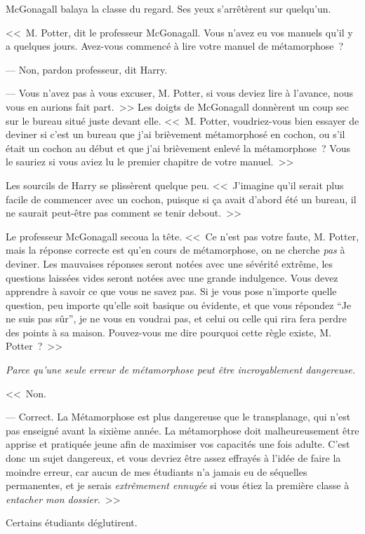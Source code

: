 McGonagall balaya la classe du regard. Ses yeux s'arrêtèrent sur quelqu'un.

<<~M. Potter, dit le professeur McGonagall. Vous n'avez eu vos manuels qu'il y a quelques jours. Avez-vous commencé à lire votre manuel de métamorphose~?

--- Non, pardon professeur, dit Harry.

--- Vous n'avez pas à vous excuser, M. Potter, si vous deviez lire à l'avance, nous vous en aurions fait part.~>> Les doigts de McGonagall donnèrent un coup sec sur le bureau situé juste devant elle. <<~M. Potter, voudriez-vous bien essayer de deviner si c'est un bureau que j'ai brièvement métamorphosé en cochon, ou s'il était un cochon au début et que j'ai brièvement enlevé la métamorphose~? Vous le sauriez si vous aviez lu le premier chapitre de votre manuel.~>>

Les sourcils de Harry se plissèrent quelque peu. <<~J'imagine qu'il serait plus facile de commencer avec un cochon, puisque si ça avait d'abord été un bureau, il ne saurait peut-être pas comment se tenir debout.~>>

Le professeur McGonagall secoua la tête. <<~Ce n'est pas votre faute, M. Potter, mais la réponse correcte est qu'en cours de métamorphose, on ne cherche \emph{pas} à deviner. Les mauvaises réponses seront notées avec une sévérité extrême, les questions laissées vides seront notées avec une grande indulgence. Vous devez apprendre à savoir ce que vous ne savez pas. Si je vous pose n'importe quelle question, peu importe qu'elle soit basique ou évidente, et que vous répondez “Je ne suis pas sûr”, je ne vous en voudrai pas, et celui ou celle qui rira fera perdre des points à sa maison. Pouvez-vous me dire pourquoi cette règle existe, M. Potter~?~>>

\emph{Parce qu'une seule erreur de métamorphose peut être incroyablement dangereuse.}

<<~Non.

--- Correct. La Métamorphose est plus dangereuse que le transplanage, qui n'est pas enseigné avant la sixième année. La métamorphose doit malheureusement être apprise et pratiquée jeune afin de maximiser vos capacités une fois adulte. C'est donc un sujet dangereux, et vous devriez être assez effrayés à l'idée de faire la moindre erreur, car aucun de mes étudiants n'a jamais eu de séquelles permanentes, et je serais \emph{extrêmement ennuyée} si vous étiez la première classe à \emph{entacher mon dossier}.~>>

Certains étudiants déglutirent.

